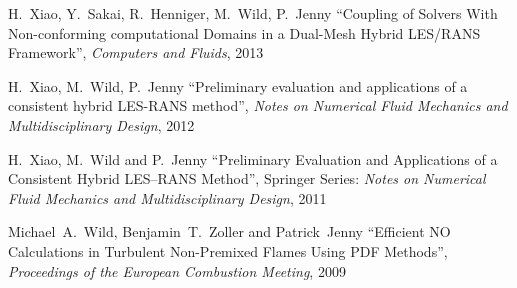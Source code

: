 \documentclass[line,11pt,a4paper]{resume}
\begin{document}
\begin{resume}
\vspace{-3mm}
H.~Xiao, Y.~Sakai, R.~Henniger, M.~Wild, P.~Jenny
``Coupling of Solvers With Non-conforming computational Domains in a Dual-Mesh
Hybrid LES/RANS Framework'', \textsl{Computers and Fluids}, 2013

\vspace{-3mm}
H.~Xiao, M.~Wild, P.~Jenny
``Preliminary evaluation and applications of a consistent hybrid LES-RANS
method'', \textsl{Notes on Numerical Fluid Mechanics and Multidisciplinary
Design}, 2012

\vspace{-3mm}
H.~Xiao, M.~Wild and P.~Jenny ``Preliminary Evaluation and
Applications of a Consistent Hybrid LES--RANS Method'', Springer Series:
\textsl{Notes on Numerical Fluid Mechanics and Multidisciplinary Design}, 2011

\vspace{-3mm}
Michael~A.~Wild, Benjamin~T.~Zoller and Patrick~Jenny
``Efficient NO Calculations in Turbulent Non-Premixed Flames Using
PDF Methods'', \textsl{Proceedings of the European Combustion Meeting}, 2009


\end{resume}
\end{document}
